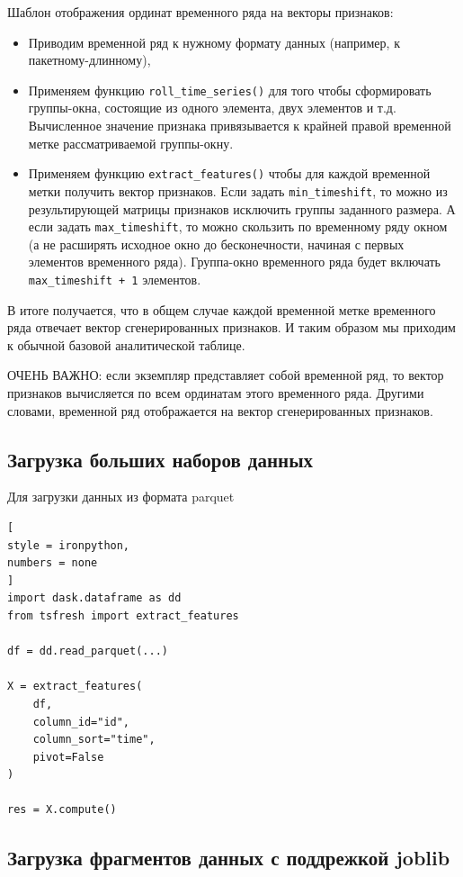 \documentclass[%
	11pt,
	a4paper,
	utf8,
		]{article}
\begin{document}
Шаблон отображения ординат временного ряда на векторы признаков:
\begin{itemize}
	\item Приводим временной ряд к нужному формату данных (например, к пакетному-длинному),
	
	\item Применяем функцию \texttt{roll\_time\_series()} для того чтобы сформировать группы-окна, состоящие из одного элемента, двух элементов и т.д. Вычисленное значение признака привязывается к крайней правой временной метке рассматриваемой группы-окну.
	
	\item Применяем функцию \texttt{extract\_features()} чтобы для каждой временной метки получить вектор признаков. Если задать \texttt{min\_timeshift}, то можно из результирующей матрицы признаков исключить группы заданного размера. А если задать \texttt{max\_timeshift}, то можно скользить по временному ряду окном (а не расширять исходное окно до бесконечности, начиная с первых элементов временного ряда). Группа-окно временного ряда будет включать \texttt{max\_timeshift + 1} элементов.
\end{itemize}

В итоге получается, что в общем случае каждой временной метке временного ряда отвечает вектор сгенерированных признаков. И таким образом мы приходим к обычной базовой аналитической таблице.

ОЧЕНЬ ВАЖНО: если экземпляр представляет собой временной ряд, то вектор признаков вычисляется по всем ординатам этого временного ряда. Другими словами, временной ряд отображается на вектор сгенерированных признаков.




\subsection{Загрузка больших наборов данных}

Для загрузки данных из формата parquet
\begin{lstlisting}[
style = ironpython,
numbers = none	
]
import dask.dataframe as dd
from tsfresh import extract_features

df = dd.read_parquet(...)

X = extract_features(
    df,
    column_id="id",
    column_sort="time",
    pivot=False
)

res = X.compute()
\end{lstlisting}

\subsection{Загрузка фрагментов данных с поддрежкой joblib}
\end{document}
